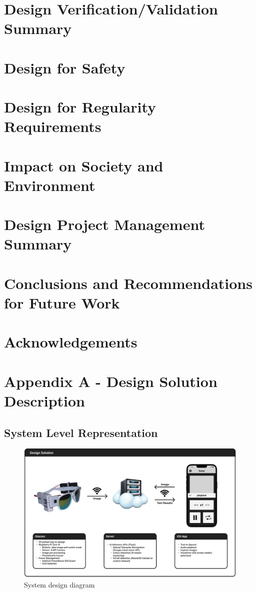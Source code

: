 \documentclass[a4paper,11pt]{article}
\begin{document}
\section{Design Verification/Validation Summary}


\section{Design for Safety}

\section{Design for Regularity Requirements}

\section{Impact on Society and Environment}

\section{Design Project Management Summary}

\section{Conclusions and Recommendations for Future Work}

\section{Acknowledgements}

\newpage
\section{Appendix A - Design Solution Description}
\subsection{System Level Representation}

\begin{figure}[H]
\centering
\includegraphics[scale=0.265]{img/system_diagram.png}
\caption{System design diagram}
\label{fig:system_diagram}
\end{figure}
\end{document}
